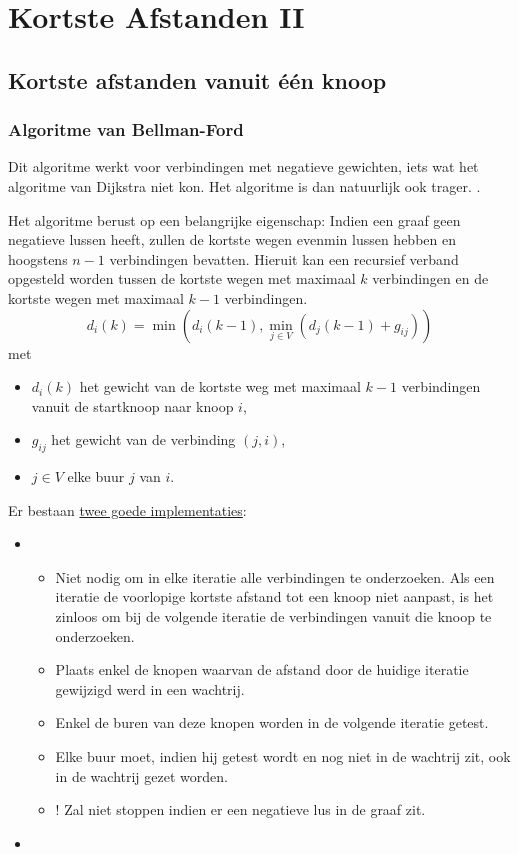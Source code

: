 \documentclass{report}
\begin{document}
\chapter{Kortste Afstanden II}
\section{Kortste afstanden vanuit één knoop}
\subsection{Algoritme van Bellman-Ford}
Dit algoritme werkt voor verbindingen met negatieve gewichten, iets wat het algoritme van Dijkstra niet kon. Het algoritme is dan natuurlijk ook trager. .



Het algoritme berust op een belangrijke eigenschap: Indien een graaf geen negatieve lussen heeft, zullen de kortste wegen evenmin lussen hebben en hoogstens $n - 1$ verbindingen bevatten. Hieruit kan een recursief verband opgesteld worden tussen de kortste wegen met maximaal $k$ verbindingen en de kortste wegen met maximaal $k - 1$ verbindingen.
$$d_i(k) = \min(d_i(k - 1), \min\limits_{j \in V} (d_j(k - 1) + g_{ij}))$$
met
\begin{itemize}
	\item $d_i(k)$ het gewicht van de kortste weg met maximaal $k - 1$ verbindingen vanuit de startknoop naar knoop $i$,
	\item $g_{ij}$ het gewicht van de verbinding $(j, i)$,
	\item $j \in V$ elke buur $j$ van $i$.
\end{itemize}

Er bestaan \underline{twee goede implementaties}:
\begin{itemize}
	\item \begin{itemize}
		\item Niet nodig om in elke iteratie alle verbindingen te onderzoeken. Als een iteratie de voorlopige kortste afstand tot een knoop niet aanpast, is het zinloos om bij de volgende iteratie de verbindingen vanuit die knoop te onderzoeken.
		\item Plaats enkel de knopen waarvan de afstand door de huidige iteratie gewijzigd werd in een wachtrij.
		\item Enkel de buren van deze knopen worden in de volgende iteratie getest.
		\item Elke buur moet, indien hij getest wordt en nog niet in de wachtrij zit, ook in de wachtrij gezet worden.
		\item ! Zal niet stoppen indien er een negatieve lus in de graaf zit. 
	\end{itemize}
	\item {}

\end{itemize}
\end{document}
